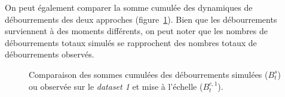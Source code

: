 \documentclass[a4paper, 11pt]{article}
\begin{document}
On peut également comparer la somme cumulée des dynamiques de débourrements des deux approches (figure~\ref{burst}). Bien que les débourrements surviennent à des moments différents, on peut noter que les nombres de débourrements totaux simulés se rapprochent des nombres totaux de débourrements observés. 

%  
% 

\begin{figure}[ht]
 \centering
 \caption{Comparaison des sommes cumulées des débourrements simulées ($B_t^s$) ou observée sur le \textit{dataset 1} et mise à l'échelle ($B_t^{c,1}$).}
 \label{burst}
\end{figure}

\clearpage
 

\end{document}
